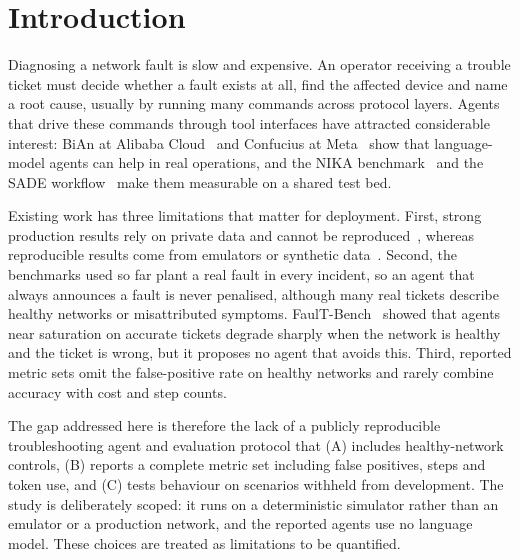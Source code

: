 \documentclass[pdflatex,sn-basic,Numbered,iicol]{sn-jnl}
\begin{document}
\maketitle

\section{Introduction}\label{sec:intro}

Diagnosing a network fault is slow and expensive. An operator receiving a trouble ticket must decide whether a fault exists at all, find the affected device and name a root cause, usually by running many commands across protocol layers. Agents that drive these commands through tool interfaces have attracted considerable interest: BiAn at Alibaba Cloud~\cite{wang2025bian} and Confucius at Meta~\cite{wang2025confucius} show that language-model agents can help in real operations, and the NIKA benchmark~\cite{wang2025nika} and the SADE workflow~\cite{tseng2026sade} make them measurable on a shared test bed.

Existing work has three limitations that matter for deployment. First, strong production results rely on private data and cannot be reproduced~\cite{wang2025bian,wang2025confucius,shi2025mas}, whereas reproducible results come from emulators or synthetic data~\cite{wang2025nika,tseng2026sade,sana2025telelogs}. Second, the benchmarks used so far plant a real fault in every incident, so an agent that always announces a fault is never penalised, although many real tickets describe healthy networks or misattributed symptoms. FaulT-Bench~\cite{tseng2026faultbench} showed that agents near saturation on accurate tickets degrade sharply when the network is healthy and the ticket is wrong, but it proposes no agent that avoids this. Third, reported metric sets omit the false-positive rate on healthy networks and rarely combine accuracy with cost and step counts.

The gap addressed here is therefore the lack of a publicly reproducible troubleshooting agent and evaluation protocol that (A) includes healthy-network controls, (B) reports a complete metric set including false positives, steps and token use, and (C) tests behaviour on scenarios withheld from development. The study is deliberately scoped: it runs on a deterministic simulator rather than an emulator or a production network, and the reported agents use no language model. These choices are treated as limitations to be quantified.
\end{document}
